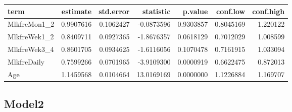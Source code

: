 \documentclass[]{article}
\newenvironment{Shaded}{\begin{snugshade}}{\end{snugshade}}
\newcommand{\DataTypeTok}[1]{\textcolor[rgb]{0.13,0.29,0.53}{#1}}
\newcommand{\KeywordTok}[1]{\textcolor[rgb]{0.13,0.29,0.53}{\textbf{#1}}}
\newcommand{\NormalTok}[1]{#1}
\newcommand{\OperatorTok}[1]{\textcolor[rgb]{0.81,0.36,0.00}{\textbf{#1}}}
\newcommand{\OtherTok}[1]{\textcolor[rgb]{0.56,0.35,0.01}{#1}}
\newcommand{\StringTok}[1]{\textcolor[rgb]{0.31,0.60,0.02}{#1}}
\begin{document}
\begin{longtable}[]{@{}lrrrrrr@{}}
\toprule
term & estimate & std.error & statistic & p.value & conf.low &
conf.high\tabularnewline
\midrule
\endhead
MlkfreMon1\_2 & 0.9907616 & 0.1062427 & -0.0873596 & 0.9303857 &
0.8045169 & 1.220122\tabularnewline
MlkfreWek1\_2 & 0.8409711 & 0.0927365 & -1.8676357 & 0.0618129 &
0.7012029 & 1.008599\tabularnewline
MlkfreWek3\_4 & 0.8601705 & 0.0934625 & -1.6116056 & 0.1070478 &
0.7161915 & 1.033094\tabularnewline
MlkfreDaily & 0.7599266 & 0.0701965 & -3.9109300 & 0.0000919 & 0.6622475
& 0.872013\tabularnewline
Age & 1.1459568 & 0.0104664 & 13.0169169 & 0.0000000 & 1.1226884 &
1.169707\tabularnewline
\bottomrule
\end{longtable}

\hypertarget{model2}{%
\subsection{Model2}\label{model2}}

\begin{Shaded}
\end{Shaded}
\end{document}
